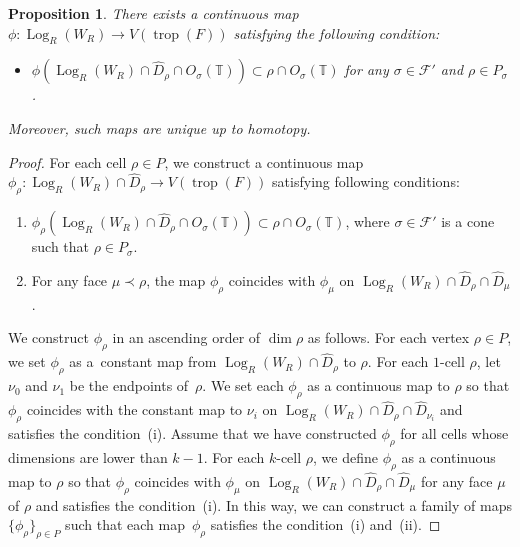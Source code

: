 \documentclass[10pt,a4paper]{amsart}
\numberwithin{equation}{section}
\newtheorem{Proposition}[Theorem]{Proposition}
 { \theoremstyle{definition}
\newtheorem{Definition}[Theorem]{Definition}
\newtheorem{Example}[Theorem]{Example} }
\begin{document}
\begin{Proposition}\label{pr:phi} There exists a continuous map $\phi \colon \operatorname{Log}_R(W_R) \to V(\operatorname{trop}(F))$ satisfying the following condition:
\begin{itemize}\itemsep=0pt
 \item[$(\ast)$] $\phi(\operatorname{Log}_R(W_R) \cap \widehat{D}_{\rho} \cap O_\sigma({\mathbb T})) \subset \rho \cap O_\sigma({\mathbb T})$ for any $\sigma \in {\mathcal F}'$ and $\rho \in P_\sigma$.
\end{itemize}
Moreover, such maps are unique up to homotopy.
\end{Proposition}
\begin{proof}
For each cell $\rho \in P$, we construct a continuous map $\phi_\rho \colon \operatorname{Log}_R(W_R) \cap \widehat{D}_{\rho} \to V(\operatorname{trop}(F))$ satisfying following conditions:
\begin{enumerate}\itemsep=0pt
\item[(i)] $\phi_{\rho}(\operatorname{Log}_R(W_R) \cap \widehat{D}_\rho \cap O_\sigma({\mathbb T})) \subset \rho \cap O_\sigma({\mathbb T})$, where $\sigma \in {\mathcal F}'$ is a cone such that $\rho \in P_\sigma$. %
\item[(ii)] For any face $\mu \prec \rho$, the map $\phi_\rho$ coincides with $\phi_\mu$ on $\operatorname{Log}_R(W_R) \cap \widehat{D}_\rho \cap \widehat{D}_\mu$. %
\end{enumerate}
We construct $\phi_\rho$ in an ascending order of $\dim \rho$ as follows. For each vertex $\rho \in P$, we set $\phi_\rho$ as a~constant map from $\operatorname{Log}_R(W_R) \cap \widehat{D}_\rho$ to $\rho$. For each $1$-cell $\rho$, let $\nu_0$ and $\nu_1$ be the endpoints of~$\rho$. We set each $\phi_\rho$ as a continuous map to $\rho$ so that $\phi_\rho$ coincides with the constant map to $\nu_i$ on $\operatorname{Log}_R(W_R) \cap \widehat{D}_\rho \cap \widehat{D}_{\nu_i}$ and satisf\/ies the condition~(i). Assume that we have constructed $\phi_\rho$ for all cells whose dimensions are lower than $k-1$. For each $k$-cell $\rho$, we def\/ine $\phi_\rho$ as a continuous map to $\rho$ so that $\phi_\rho$ coincides with $\phi_\mu$ on $\operatorname{Log}_R(W_R) \cap \widehat{D}_\rho \cap \widehat{D}_{\mu}$ for any face $\mu$ of $\rho$ and satisf\/ies the condition~(i). In this way, we can construct a family of maps $\{\phi_\rho\}_{\rho \in P}$ such that each map~$\phi_\rho$ satisf\/ies the condition~(i) and~(ii).


\end{proof}
\end{document}
